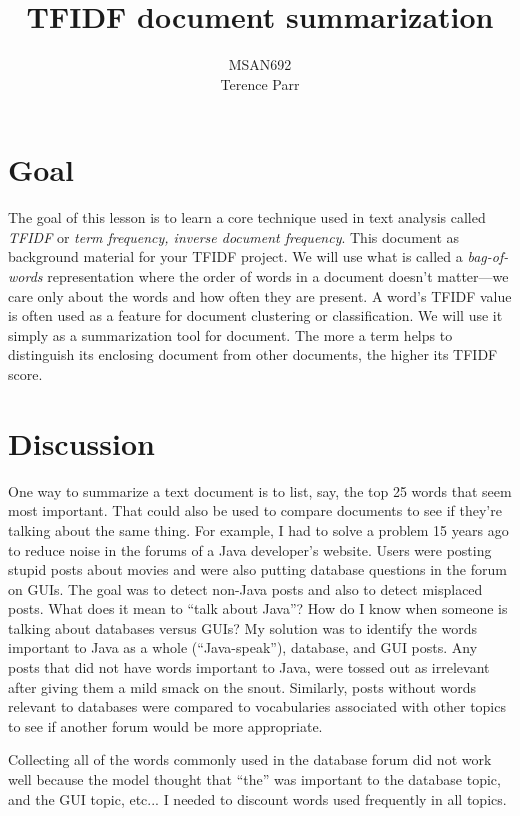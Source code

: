 \documentclass[10pt]{article}
\title{TFIDF document summarization}
\author{MSAN692\\Terence Parr}
\date{} %
\begin{document}
\maketitle

\setlength{\algomargin}{3pt}

\section{Goal}

The goal of this lesson is to learn a core technique used in text analysis called {\em TFIDF} or {\em term frequency, inverse document frequency}. This document as background material for your TFIDF project. We will use what is called a {\em bag-of-words} representation where the order of words in a document doesn't matter---we care only about the words and how often they are present. A word's TFIDF value is often used as a feature for document clustering or classification. We will use it simply as a summarization tool for document. The more a term helps to distinguish its enclosing document from other documents, the higher its TFIDF score. 

\section{Discussion}

One way to summarize a text document is to list, say, the top 25 words that seem most important. That could also be used to compare documents to see if they're talking about the same thing. For example, I had to solve a problem 15 years ago to reduce noise in the forums of a Java developer's website.  Users were posting stupid posts about movies and were also putting database questions in the forum on GUIs. The goal was to detect non-Java posts and also to detect misplaced posts. What does it mean to ``talk about Java''?  How do I know when someone is talking about databases versus GUIs? My solution was to identify the words important to Java as a whole (``Java-speak''), database, and GUI posts.  Any posts that did not have words important to Java, were tossed out as irrelevant after giving them a mild smack on the snout. Similarly, posts without words relevant to databases were compared to vocabularies associated with other topics to see if another forum would be more appropriate.  

Collecting all of the words commonly used in the database forum did not work well because the model  thought that ``the'' was important to the database topic, and the GUI topic, etc... I needed to discount words used frequently in all topics.
\end{document}

